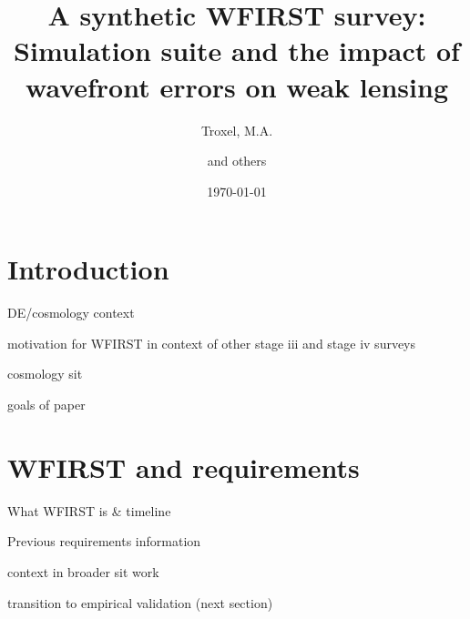 \documentclass[aps,prd, amsmath,amssymb,superscriptaddress,showkeys,nofootinbib,reprint,preprintnumbers]{revtex4-1}
\begin{document}
\title{A synthetic WFIRST survey: Simulation suite and the impact of wavefront errors on weak lensing}

\author{Troxel, M.A.}
\author{and others}


\noaffiliation

\date{\today}

\label{firstpage}

\begin{abstract}
\end{abstract}

\keywords{}

\maketitle


\section{Introduction}\label{sec:intro}

DE/cosmology context

motivation for WFIRST in context of other stage iii and stage iv surveys

cosmology sit

goals of paper

\section{WFIRST and requirements}\label{sec:wfirst}

What WFIRST is \& timeline

Previous requirements information

context in broader sit work

transition to empirical validation (next section)
\end{document}
